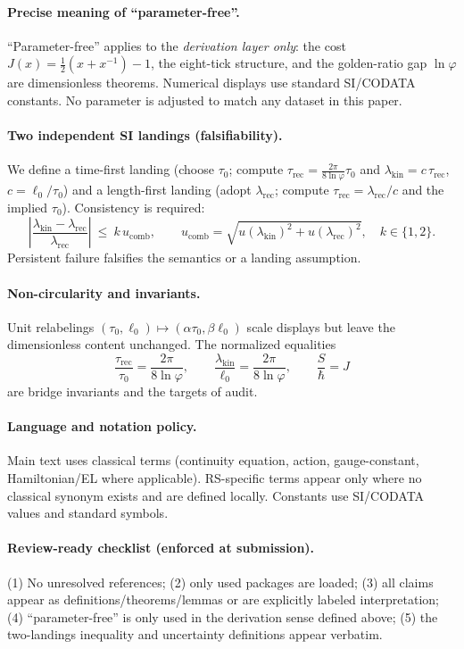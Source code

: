 \documentclass[11pt]{article}
\begin{document}
\paragraph{Precise meaning of “parameter-free”.}
“Parameter-free” applies to the \emph{derivation layer only}: the cost \(J(x)=\tfrac12(x+x^{-1})-1\), the eight-tick structure, and the golden-ratio gap \(\ln\varphi\) are dimensionless theorems. Numerical displays use standard SI/CODATA constants. No parameter is adjusted to match any dataset in this paper.

\paragraph{Two independent SI landings (falsifiability).}
We define a time-first landing (choose \(\tau_0\); compute \(\tau_{\mathrm{rec}}=\frac{2\pi}{8\ln\varphi}\tau_0\) and \(\lambda_{\mathrm{kin}}=c\,\tau_{\mathrm{rec}}\), \(c=\ell_0/\tau_0\)) and a length-first landing (adopt \(\lambda_{\mathrm{rec}}\); compute \(\tau_{\mathrm{rec}}=\lambda_{\mathrm{rec}}/c\) and the implied \(\tau_0\)). Consistency is required:
\[
\left|\frac{\lambda_{\mathrm{kin}}-\lambda_{\mathrm{rec}}}{\lambda_{\mathrm{rec}}}\right|\ \le\ k\,u_{\mathrm{comb}},\qquad
u_{\mathrm{comb}}=\sqrt{u(\lambda_{\mathrm{kin}})^2+u(\lambda_{\mathrm{rec}})^2},\quad k\in\{1,2\}.
\]
Persistent failure falsifies the semantics or a landing assumption.

\paragraph{Non-circularity and invariants.}
Unit relabelings \((\tau_0,\ell_0)\mapsto(\alpha\tau_0,\beta\ell_0)\) scale displays but leave the dimensionless content unchanged. The normalized equalities
\[
\frac{\tau_{\mathrm{rec}}}{\tau_0}=\frac{2\pi}{8\ln\varphi},\qquad
\frac{\lambda_{\mathrm{kin}}}{\ell_0}=\frac{2\pi}{8\ln\varphi},\qquad
\frac{S}{\hbar}=J
\]
are bridge invariants and the targets of audit.

\paragraph{Language and notation policy.}
Main text uses classical terms (continuity equation, action, gauge-constant, Hamiltonian/EL where applicable). RS-specific terms appear only where no classical synonym exists and are defined locally. Constants use SI/CODATA values and standard symbols.

\paragraph{Review-ready checklist (enforced at submission).}
(1) No unresolved references; (2) only used packages are loaded; (3) all claims appear as definitions/theorems/lemmas or are explicitly labeled interpretation; (4) “parameter-free” is only used in the derivation sense defined above; (5) the two-landings inequality and uncertainty definitions appear verbatim.
\end{document}
